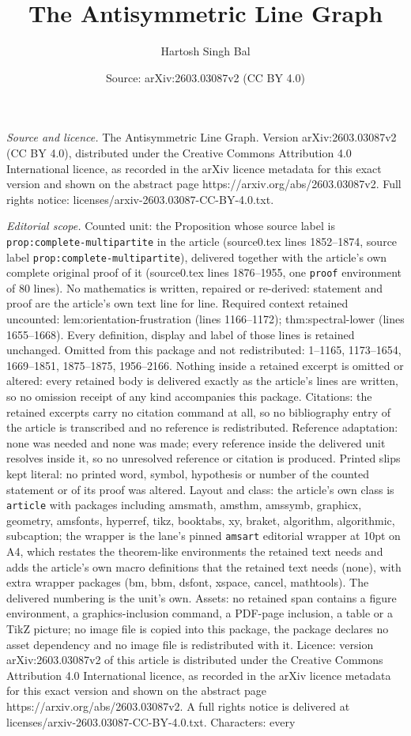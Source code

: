 \documentclass[10pt,a4paper]{amsart}
\title[The Antisymmetric Line Graph]{The Antisymmetric Line Graph}
\author{Hartosh Singh Bal}
\date{Source: arXiv:2603.03087v2 (CC BY 4.0)}
\begin{document}
\maketitle

\noindent\emph{Source and licence.} The Antisymmetric Line Graph. Version arXiv:2603.03087v2 (CC BY 4.0), distributed under the Creative Commons Attribution 4.0 International licence, as recorded in the arXiv licence metadata for this exact version and shown on the abstract page https://arxiv.org/abs/2603.03087v2. Full rights notice: licenses/arxiv-2603.03087-CC-BY-4.0.txt.\par\smallskip

\noindent\textit{Editorial scope.} Counted unit: the Proposition whose source label is \texttt{prop:complete-multipartite} in the article (source0.tex lines 1852--1874, source label \texttt{prop:complete-multipartite}), delivered together with the article's own complete original proof of it (source0.tex lines 1876--1955, one \texttt{proof} environment of 80 lines). No mathematics is written, repaired or re-derived: statement and proof are the article's own text line for line. Required context retained uncounted: lem:orientation-frustration (lines 1166--1172); thm:spectral-lower (lines 1655--1668). Every definition, display and label of those lines is retained unchanged. Omitted from this package and not redistributed: 1--1165, 1173--1654, 1669--1851, 1875--1875, 1956--2166. Nothing inside a retained excerpt is omitted or altered: every retained body is delivered exactly as the article's lines are written, so no omission receipt of any kind accompanies this package. Citations: the retained excerpts carry no citation command at all, so no bibliography entry of the article is transcribed and no reference is redistributed. Reference adaptation: none was needed and none was made; every reference inside the delivered unit resolves inside it, so no unresolved reference or citation is produced. Printed slips kept literal: no printed word, symbol, hypothesis or number of the counted statement or of its proof was altered. Layout and class: the article's own class is \texttt{article} with packages including amsmath, amsthm, amssymb, graphicx, geometry, amsfonts, hyperref, tikz, booktabs, xy, braket, algorithm, algorithmic, subcaption; the wrapper is the lane's pinned \texttt{amsart} editorial wrapper at 10pt on A4, which restates the theorem-like environments the retained text needs and adds the article's own macro definitions that the retained text needs (none), with extra wrapper packages (bm, bbm, dsfont, xspace, cancel, mathtools). The delivered numbering is the unit's own. Assets: no retained span contains a figure environment, a graphics-inclusion command, a PDF-page inclusion, a table or a TikZ picture; no image file is copied into this package, the package declares no asset dependency and no image file is redistributed with it. Licence: version arXiv:2603.03087v2 of this article is distributed under the Creative Commons Attribution 4.0 International licence, as recorded in the arXiv licence metadata for this exact version and shown on the abstract page https://arxiv.org/abs/2603.03087v2. A full rights notice is delivered at licenses/arxiv-2603.03087-CC-BY-4.0.txt. Characters: every 
\end{document}
